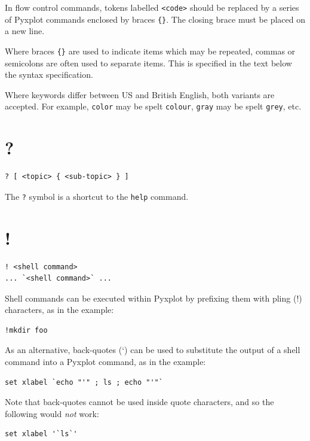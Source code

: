 In flow control commands, tokens labelled {\tt <code>} should be replaced by a
series of Pyxplot commands enclosed by braces {\tt \{\}}. The closing brace
must be placed on a new line.

Where braces {\tt \{\}} are used to indicate items which may be repeated,
commas or semicolons are often used to separate items. This is specified in the
text below the syntax specification.

Where keywords differ between US and British English, both variants are
accepted. For example, {\tt color} may be spelt {\tt colour}, {\tt gray} may be
spelt {\tt grey}, etc.

\section{?}

\begin{verbatim}
? [ <topic> { <sub-topic> } ]
\end{verbatim}

The {\tt ?} symbol is a shortcut to the {\tt help} command.


\section{!}\indcmd{!}

\begin{verbatim}
! <shell command>
... `<shell command>` ...
\end{verbatim}

Shell commands can be executed within Pyxplot by prefixing them with
pling (!) characters, as in the example:

\begin{verbatim}
!mkdir foo
\end{verbatim}

\noindent As an alternative, back-quotes (`) can be used to substitute the
output of a shell command into a Pyxplot command, as in the example:

\begin{verbatim}
set xlabel `echo "'" ; ls ; echo "'"`
\end{verbatim}

\noindent Note that back-quotes cannot be used inside quote characters, and so
the following would \textit{not} work:

\begin{verbatim}
set xlabel '`ls`'
\end{verbatim}


